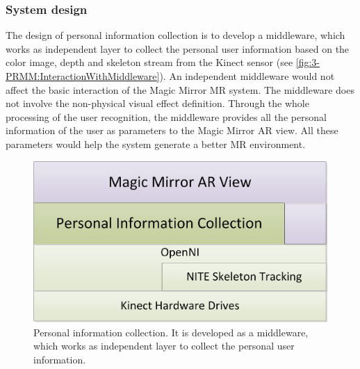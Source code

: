 \subsubsection{System design}
The design of personal information collection is to develop a middleware, which works as independent layer to collect the personal user information based on the color image, depth and skeleton stream from the Kinect sensor (see \figurename{\ref{fig:3-PRMM:InteractionWithMiddleware}}). An independent middleware would not affect the basic interaction of the Magic Mirror MR system. The middleware does not involve the non-physical visual effect definition. Through the whole processing of the user recognition, the middleware provides all the personal information of the user as parameters to the Magic Mirror AR view. All these parameters would help the system generate a better MR environment. 
\begin{figure}
	\centering
	\includegraphics[width=0.7\linewidth]{figures/3-PRMM/middlewareFramework.png}
	\caption{Personal information collection. It is developed as a middleware, which works as independent layer to collect the personal user information.}
	\label{fig:3-PRMM:middlewareFramework}
\end{figure}

